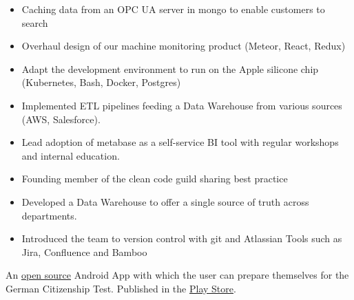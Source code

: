 \documentclass[10pt,a4paper,ragged2e,withhyper]{altacv}
\begin{document}
\begin{paracol}{2}

\begin{itemize}
  \item Caching data from an OPC UA server in mongo to enable customers to search
  \item Overhaul design of our machine monitoring product (Meteor, React, Redux)
  \item Adapt the development environment to run on the Apple silicone chip (Kubernetes, Bash, Docker, Postgres)
  \end{itemize}

\divider

\begin{itemize}
\item Implemented ETL pipelines feeding a Data Warehouse from various sources (AWS, Salesforce).
\item Lead adoption of metabase as a self-service BI tool with regular workshops and internal education.
\item Founding member of the clean code guild sharing best practice
\end{itemize}

\divider

\begin{itemize}
\item Developed a Data Warehouse to offer a single source of truth across departments.
\item Introduced the team to version control with git and Atlassian Tools such as Jira, Confluence and Bamboo
\end{itemize}


An \href{https://github.com/nikolasrieble/AndroidApp_GermanCitizenship}{open source} Android App with which the user can prepare themselves for the German Citizenship Test.
Published in the \href{https://play.google.com/store/apps/details?id=com.nrieble.quizapp}{Play Store}.



\end{paracol}
\end{document}
